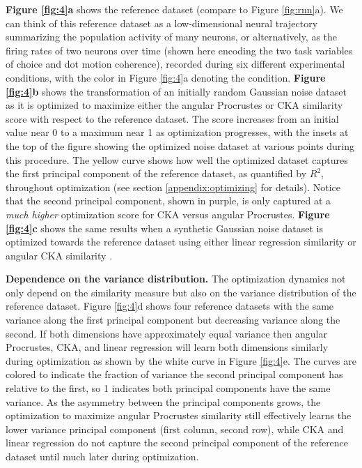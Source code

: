 \documentclass{article} %
\begin{document}
\textbf{Figure \ref{fig:4}a} shows the reference dataset (compare to Figure \ref{fig:rnn}a). We can think of this reference dataset as a low-dimensional neural trajectory summarizing the population activity of many neurons, or alternatively, as the firing rates of two neurons over time (shown here encoding the two task variables of choice and dot motion coherence), recorded during six different experimental conditions, with the color in Figure \ref{fig:4}a denoting the condition. \textbf{Figure \ref{fig:4}b} shows the transformation of an initially random Gaussian noise dataset as it is optimized to maximize either the angular Procrustes or CKA similarity score with respect to the reference dataset. The score increases from an initial value near 0 to a maximum near 1 as optimization progresses, with the insets at the top of the figure showing the optimized noise dataset at various points during this procedure. The yellow curve shows how well the optimized dataset captures the first principal component of the reference dataset, as quantified by $R^{2}$, throughout optimization (see section \ref{appendix:optimizing} for details). %
Notice that the second principal component, shown in purple, is only captured at a \textit{much higher} optimization score for CKA versus angular Procrustes. \textbf{Figure \ref{fig:4}c} shows the same results when a synthetic Gaussian noise dataset is optimized towards the reference dataset using either linear regression similarity or angular CKA similarity \citep{Williams2021}.



\textbf{Dependence on the variance distribution.} The optimization dynamics not only depend on the similarity measure but also on the variance distribution of the reference dataset. Figure \ref{fig:4}d shows four reference datasets with the same variance along the first principal component but decreasing variance along the second. If both dimensions have approximately equal variance then angular Procrustes, CKA, and linear regression will learn both dimensions similarly during optimization as shown by the white curve in Figure \ref{fig:4}e. The curves are colored to indicate the fraction of variance the second principal component has relative to the first, so 1 indicates both principal components have the same variance. As the asymmetry between the principal components grows, the optimization to maximize angular Procrustes similarity still effectively learns %
the lower variance principal component (first column, second row), while CKA and linear regression do not capture the second principal component of the reference dataset until much later during optimization.
\end{document}
